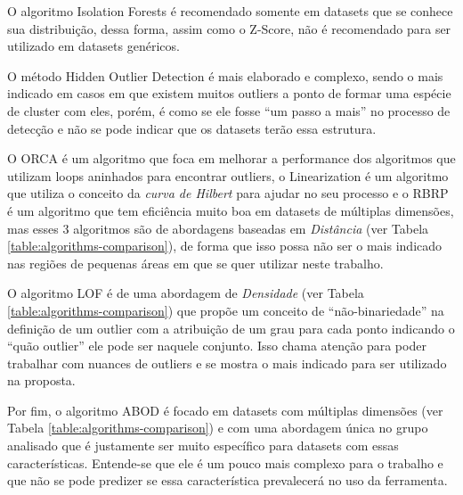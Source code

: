 O algoritmo Isolation Forests é recomendado somente em datasets que se conhece sua distribuição, dessa forma, assim como o Z-Score, não é recomendado para ser utilizado em datasets genéricos.

O método Hidden Outlier Detection é mais elaborado e complexo, sendo o mais indicado em casos em que existem muitos outliers a ponto de formar uma espécie de cluster com eles, porém, é como se ele fosse ``um passo a mais'' no processo de detecção e não se pode indicar que os datasets terão essa estrutura.

O ORCA é um algoritmo que foca em melhorar a performance dos algoritmos que utilizam loops aninhados para encontrar outliers, o Linearization é um algoritmo que utiliza o conceito da \textit{curva de Hilbert} para ajudar no seu processo e o RBRP é um algoritmo que tem eficiência muito boa em datasets de múltiplas dimensões, mas esses 3 algoritmos são de abordagens baseadas em \textit{Distância} (ver Tabela \ref{table:algorithms-comparison}), de forma que isso possa não ser o mais indicado nas regiões de pequenas áreas em que se quer utilizar neste trabalho.

O algoritmo LOF é de uma abordagem de \textit{Densidade} (ver Tabela \ref{table:algorithms-comparison}) que propõe um conceito de ``não-binariedade'' na definição de um outlier com a atribuição de um grau para cada ponto indicando o ``quão outlier'' ele pode ser naquele conjunto. Isso chama atenção para poder trabalhar com nuances de outliers e se mostra o mais indicado para ser utilizado na proposta.

Por fim, o algoritmo ABOD é focado em datasets com múltiplas dimensões (ver Tabela \ref{table:algorithms-comparison}) e com uma abordagem única no grupo analisado que é justamente ser muito específico para datasets com essas características. Entende-se que ele é um pouco mais complexo para o trabalho e que não se pode predizer se essa característica prevalecerá no uso da ferramenta.